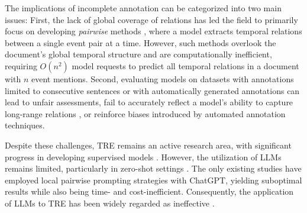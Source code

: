 The implications of incomplete annotation can be categorized into two main issues: First, the lack of global coverage of relations has led the field to primarily focus on developing \textit{pairwise} methods \cite{wen-ji-2021-utilizing, zhou-etal-2022-rsgt}, where a model extracts temporal relations between a single event pair at a time. 
However, such methods overlook the document's global temporal structure and are computationally inefficient, requiring $O(n^2)$ model requests to predict all temporal relations in a document with $n$ event mentions.
Second, evaluating models on datasets with annotations limited to consecutive sentences or with automatically generated annotations can lead to unfair assessments, fail to accurately reflect a model’s ability to capture long-range relations \cite{alsayyahi-batista-navarro-2023-timeline}, or reinforce biases introduced by automated annotation techniques.




Despite these challenges, TRE remains an active research area, with significant progress in developing supervised models \cite{tan-etal-2023-event, niu-etal-2024-contempo, Chen2024PromptBasedET}. However, the utilization of LLMs remains limited, particularly in zero-shot settings \cite{10.5555/3600270.3601883}.
The only existing studies \cite{yuan-etal-2023-zero, chan-etal-2024-exploring} have employed local pairwise prompting strategies with ChatGPT, yielding suboptimal results while also being time- and cost-inefficient. Consequently, the application of LLMs to TRE has been widely regarded as ineffective \cite{alsayyahi-batista-navarro-2023-timeline, wei-etal-2024-llms, niu-etal-2024-contempo, chan-etal-2024-exploring}.



